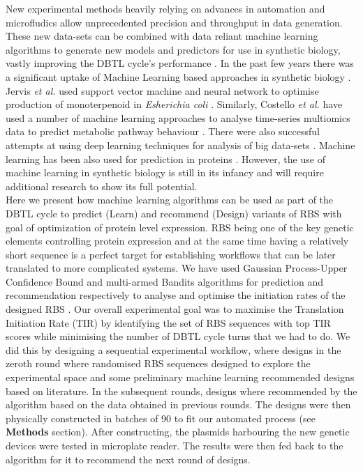 \documentclass{article}
\begin{document}
New experimental methods heavily relying on advances in automation and microfludics allow unprecedented precision and throughput in data generation.
These new data-sets can be combined with data reliant machine learning algorithms to generate new models and predictors for use in synthetic biology, vastly improving the DBTL cycle's performance \cite{Camacho2018}. 
In the past few years there was a significant uptake of Machine Learning based approaches in synthetic biology \cite{LAWSON2021}.
Jervis \emph{et al.} used support vector machine and neural network to optimise production of monoterpenoid in \emph{Esherichia coli} \cite{Jervis2019}.
Similarly, Costello \emph{et al.} have used a number of machine learning approaches to analyse time-series multiomics data to predict metabolic pathway behaviour \cite{Costello2018}.
There were also successful attempts at using deep learning techniques for analysis of big data-sets \cite{Alipanahi2015,Angermueller2016}. Machine learning has been also used for prediction in proteins \cite{Yang2018}.
However, the use of machine learning in synthetic biology is still in its infancy and will require additional research to show its full potential. \\
Here we present how machine learning algorithms can be used as part of the DBTL cycle to predict (Learn) and recommend (Design) variants of RBS with goal of optimization of protein level expression. RBS being one of the key genetic elements controlling protein expression and at the same time having a relatively short sequence is a perfect target for establishing workflows that can be later translated to more complicated systems.
We have used Gaussian Process-Upper Confidence Bound and multi-armed Bandits algorithms for prediction and recommendation respectively to analyse and optimise the initiation rates of the designed RBS \cite{desautels2012parallelizing, Rasmussen2004}.
Our overall experimental goal was to maximise the Translation Initiation Rate (TIR) by identifying the set of RBS sequences with top TIR scores while minimising the number of DBTL cycle turns that we had to do.
We did this by designing a sequential experimental workflow, where designs in the zeroth round where randomised RBS sequences designed to explore the experimental space and some preliminary machine learning recommended designs based on literature. 
In the subsequent rounds, designs where recommended by the algorithm based on the data obtained in previous rounds. 
The designs were then physically constructed in batches of 90 to fit our automated process (see \textbf{Methods} section).
After constructing, the plasmids harbouring the new genetic devices were tested in microplate reader.
The results were then fed back to the algorithm for it to recommend the next round of designs.\\
\end{document}
